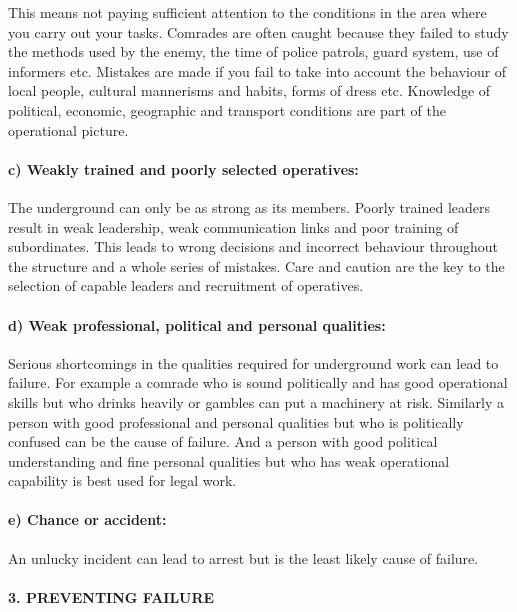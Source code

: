 This means not paying sufficient attention to the conditions in the area
where you carry out your tasks. Comrades are often caught because they
failed to study the methods used by the enemy, the time of police
patrols, guard system, use of informers etc. Mistakes are made if you
fail to take into account the behaviour of local people, cultural
mannerisms and habits, forms of dress etc. Knowledge of political,
economic, geographic and transport conditions are part of the
operational picture.

\paragraph{c) Weakly trained and poorly selected operatives:}

The underground can only be as strong as its members. Poorly trained
leaders result in weak leadership, weak communication links and poor
training of subordinates. This leads to wrong decisions and incorrect
behaviour throughout the structure and a whole series of mistakes. Care
and caution are the key to the selection of capable leaders and
recruitment of operatives.

\paragraph{d) Weak professional, political and personal qualities:}

Serious shortcomings in the qualities required for underground work can
lead to failure. For example a comrade who is sound politically and has
good operational skills but who drinks heavily or gambles can put a
machinery at risk. Similarly a person with good professional and
personal qualities but who is politically confused can be the cause of
failure. And a person with good political understanding and fine
personal qualities but who has weak operational capability is best used
for legal work.

\paragraph{e) Chance or accident:}

An unlucky incident can lead to arrest but is the least likely cause of
failure.

\paragraph{3. PREVENTING FAILURE}

